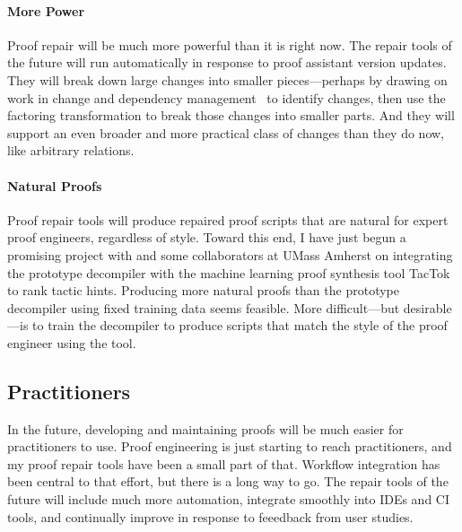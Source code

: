 \paragraph{More Power} 
Proof repair will be much more powerful than it is right now.
The repair tools of the future will run automatically in response to proof assistant version updates.
They will break down large changes into smaller pieces---perhaps by drawing on work in change and 
dependency management~\cite{873647, Autexier:2010:CMH:1986659.1986663, Celik:2017:IRP:3155562.3155588} to identify changes, then use the factoring transformation
to break those changes into smaller parts.
And they will support an even broader and more practical class of changes than they do now,
like arbitrary relations.

\paragraph{Natural Proofs}
Proof repair tools will produce repaired proof scripts that are natural for expert proof engineers, regardless of style.
Toward this end, I have just begun a promising project with  and some collaborators at UMass Amherst
on integrating the prototype decompiler with the machine learning proof synthesis tool TacTok~\cite{10.1145/3428299} to rank tactic hints.
Producing more natural proofs than the prototype decompiler using fixed training data seems feasible.
More difficult---but desirable---is to train the decompiler to produce scripts that match the style of the proof engineer using the tool.

\subsection*{Practitioners}

In the future, developing and maintaining proofs will be much easier for practitioners to use.
Proof engineering is just starting to reach practitioners, and my proof repair tools have been a small part of that.
Workflow integration has been central to that effort, but there is a long way to go.
The repair tools of the future will include much more automation,
integrate smoothly into IDEs and CI tools,
and continually improve in response to feeedback from user studies.

